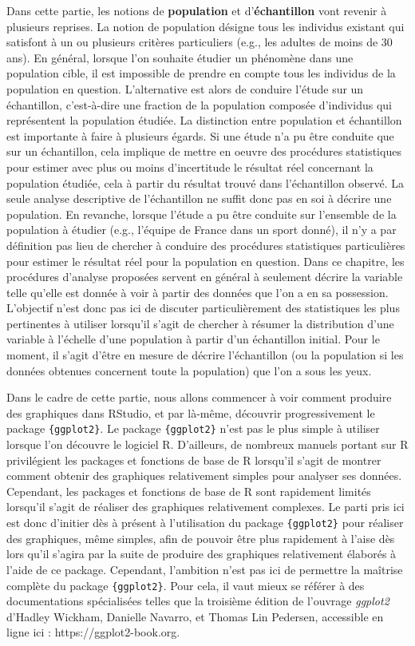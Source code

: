 \documentclass[
  letterpaper,
]{book}
\begin{document}
Dans cette partie, les notions de \textbf{population} et
d'\textbf{échantillon} vont revenir à plusieurs reprises. La notion de
population désigne tous les individus existant qui satisfont à un ou
plusieurs critères particuliers (e.g., les adultes de moins de 30 ans).
En général, lorsque l'on souhaite étudier un phénomène dans une
population cible, il est impossible de prendre en compte tous les
individus de la population en question. L'alternative est alors de
conduire l'étude sur un échantillon, c'est-à-dire une fraction de la
population composée d'individus qui représentent la population étudiée.
La distinction entre population et échantillon est importante à faire à
plusieurs égards. Si une étude n'a pu être conduite que sur un
échantillon, cela implique de mettre en oeuvre des procédures
statistiques pour estimer avec plus ou moins d'incertitude le résultat
réel concernant la population étudiée, cela à partir du résultat trouvé
dans l'échantillon observé. La seule analyse descriptive de
l'échantillon ne suffit donc pas en soi à décrire une population. En
revanche, lorsque l'étude a pu être conduite sur l'ensemble de la
population à étudier (e.g., l'équipe de France dans un sport donné), il
n'y a par définition pas lieu de chercher à conduire des procédures
statistiques particulières pour estimer le résultat réel pour la
population en question. Dans ce chapitre, les procédures d'analyse
proposées servent en général à seulement décrire la variable telle
qu'elle est donnée à voir à partir des données que l'on a en sa
possession. L'objectif n'est donc pas ici de discuter particulièrement
des statistiques les plus pertinentes à utiliser lorsqu'il s'agit de
chercher à résumer la distribution d'une variable à l'échelle d'une
population à partir d'un échantillon initial. Pour le moment, il s'agit
d'être en mesure de décrire l'échantillon (ou la population si les
données obtenues concernent toute la population) que l'on a sous les
yeux.

Dans le cadre de cette partie, nous allons commencer à voir comment
produire des graphiques dans RStudio, et par là-même, découvrir
progressivement le package \texttt{\{ggplot2\}}. Le package
\texttt{\{ggplot2\}} n'est pas le plus simple à utiliser lorsque l'on
découvre le logiciel R. D'ailleurs, de nombreux manuels portant sur R
privilégient les packages et fonctions de base de R lorsqu'il s'agit de
montrer comment obtenir des graphiques relativement simples pour
analyser ses données. Cependant, les packages et fonctions de base de R
sont rapidement limités lorsqu'il s'agit de réaliser des graphiques
relativement complexes. Le parti pris ici est donc d'initier dès à
présent à l'utilisation du package \texttt{\{ggplot2\}} pour réaliser
des graphiques, même simples, afin de pouvoir être plus rapidement à
l'aise dès lors qu'il s'agira par la suite de produire des graphiques
relativement élaborés à l'aide de ce package. Cependant, l'ambition
n'est pas ici de permettre la maîtrise complète du package
\texttt{\{ggplot2\}}. Pour cela, il vaut mieux se référer à des
documentations spécialisées telles que la troisième édition de l'ouvrage
\emph{ggplot2} d'Hadley Wickham, Danielle Navarro, et Thomas Lin
Pedersen, accessible en ligne ici : https://ggplot2-book.org.
\end{document}
